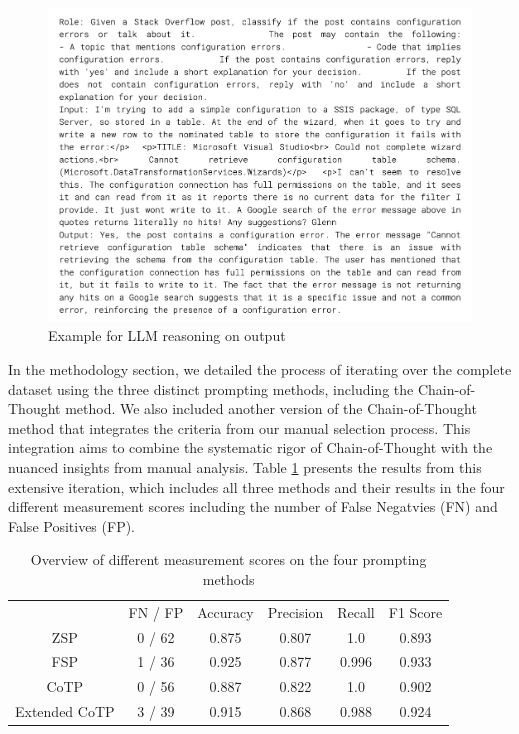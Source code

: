 \documentclass[english,bachelor]{swsLeipzig}
\begin{document}
\begin{figure}[h]
  \centering
  \includegraphics[width=1\textwidth]{images/llmextwo.png}
  \caption{Example for LLM reasoning on output}
  \label{fig:figure511}
\end{figure}

In the methodology section, we detailed the process of iterating over the complete dataset using the 
three distinct prompting methods, including the Chain-of-Thought method. We also included another version of the Chain-of-Thought method that integrates the criteria from our manual selection process. This integration aims to combine the systematic rigor of Chain-of-Thought with the nuanced insights from manual analysis. Table \ref{tab:table52} presents the results from this extensive iteration, which includes all three methods and their results in the four different measurement scores including the number of False Negatvies (FN) and False Positives (FP).

\begin{table}[ht]
  \caption{Overview of different measurement scores on the four prompting methods}
  \centering
  \begin{tabular}{cccccc}\toprule
   & FN / FP & Accuracy & Precision & Recall & F1 Score \\ \cmidrule(l){2-6}
  ZSP   & 0 / 62       & 0.875       & 0.807       & 1.0 & 0.893 \\
  FSP  & 1 / 36  & 0.925  & 0.877  & 0.996 & 0.933 \\
  CoTP & 0 / 56       & 0.887       & 0.822       & 1.0 & 0.902 \\
  Extended CoTP & 3 / 39       & 0.915       & 0.868       & 0.988 & 0.924 \\\bottomrule
  \end{tabular}
  \label{tab:table52}
\end{table}
\end{document}

